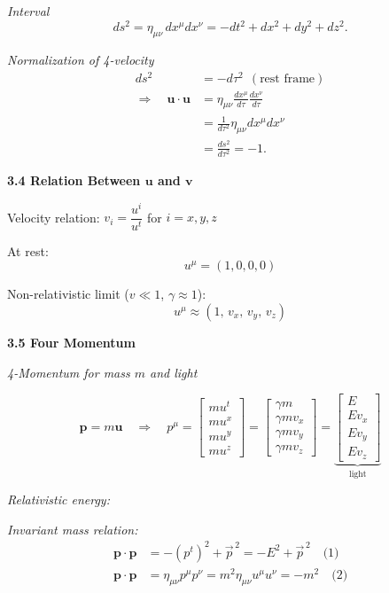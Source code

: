 \documentclass[10pt]{article}
\begin{document}
\begin{multicols*}{2}
\textit{Interval}
\[
ds^2=\eta_{\mu\nu}\,dx^\mu dx^\nu
= -dt^2+dx^2+dy^2+dz^2.
\]

\textit{Normalization of 4-velocity}
\[
\begin{aligned}
ds^2&=-d\tau^2\ \ (\text{rest frame})\\
\Rightarrow\quad
\mathbf{u}\cdot\mathbf{u}
&=\eta_{\mu\nu}\frac{dx^\mu}{d\tau}\frac{dx^\nu}{d\tau}\\
&=\frac{1}{d\tau^2}\eta_{\mu\nu}dx^\mu dx^\nu\\
&=\frac{ds^2}{d\tau^2}=\boxed{-1}.
\end{aligned}
\]

\textbf{3.4 Relation Between $\mathbf{u}$ and $\mathbf{v}$}


Velocity relation: $v_i=\dfrac{u^i}{u^t}$ for $i=x,y,z$

At rest: 
\[
u^\mu=(1,0,0,0)
\]

Non-relativistic limit ($v\ll1$, $\gamma\approx1$): 
\[
u^\mu\approx(1,\,v_x,\,v_y,\,v_z)
\]

\textbf{3.5 Four Momentum}

\textit{4-Momentum for mass $m$ and light} 

\[ 
\mathbf{p}=m\mathbf{u} \quad\Rightarrow\quad p^\mu =
\begin{bmatrix}mu^t\\ mu^x\\ mu^y\\ mu^z\end{bmatrix} =
\begin{bmatrix}\gamma m\\ \gamma m v_x\\ \gamma m v_y\\ \gamma m v_z\end{bmatrix} =
\underbrace{\begin{bmatrix}E\\ Ev_x\\ Ev_y\\ Ev_z\end{bmatrix}}_{\text{light}}
\]

\textit{Relativistic energy:} 

\textit{Invariant mass relation:}
\[
\begin{aligned}
    \mathbf{p}\cdot\mathbf{p}
    &=-(p^t)^2+\vec{p}^{\,2}
    =-E^2+\vec{p}^{\,2}\quad\text{(1)}\\
    \mathbf{p}\cdot\mathbf{p}
    &=\eta_{\mu\nu}p^\mu p^\nu
    =m^2\eta_{\mu\nu}u^\mu u^\nu
    =-m^2\quad\text{(2)}
\end{aligned}
\]


\end{multicols*}
\end{document}
